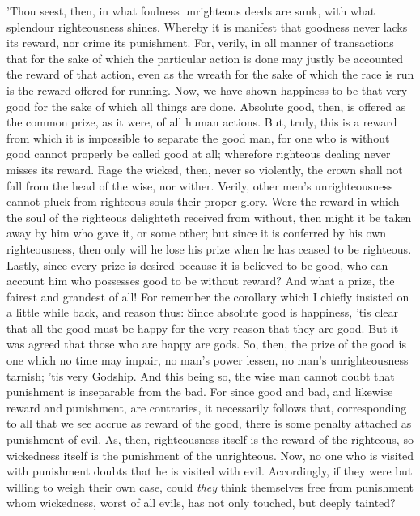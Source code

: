'Thou seest, then, in what foulness unrighteous deeds are sunk, with
what splendour righteousness shines. Whereby it is manifest that
goodness never lacks its reward, nor crime its punishment. For, verily,
in all manner of transactions that for the sake of which the particular
action is done may justly be accounted the reward of that action, even
as the wreath for the sake of which the race is run is the reward
offered for running. Now, we have shown happiness to be that very good
for the sake of which all things are done. Absolute good, then, is
offered as the common prize, as it were, of all human actions. But,
truly, this is a reward from which it is impossible to separate the good
man, for one who is without good cannot properly be called good at all;
wherefore righteous dealing never misses its reward. Rage the wicked,
then, never so violently, the crown shall not fall from the head of the
wise, nor wither. Verily, other men's unrighteousness cannot pluck from
righteous souls their proper glory. Were the reward in which the soul of
the righteous delighteth received from without, then might it be taken
away by him who gave it, or some other; but since it is conferred by his
own righteousness, then only will he lose his prize when he has ceased
to be righteous. Lastly, since every prize is desired because it is
believed to be good, who can account him who possesses good to be
without reward? And what a prize, the fairest and grandest of all! For
remember the corollary which I chiefly insisted on a little while back,
and reason thus: Since absolute good is happiness, 'tis clear that all
the good must be happy for the very reason that they are good. But it
was agreed that those who are happy are gods. So, then, the prize of the
good is one which no time may impair, no man's power lessen, no man's
unrighteousness tarnish; 'tis very Godship. And this being so, the wise
man cannot doubt that punishment is inseparable from the bad. For since
good and bad, and likewise reward and punishment, are contraries, it
necessarily follows that, corresponding to all that we see accrue as
reward of the good, there is some penalty attached as punishment of
evil. As, then, righteousness itself is the reward of the righteous, so
wickedness itself is the punishment of the unrighteous. Now, no one who
is visited with punishment doubts that he is visited with evil.
Accordingly, if they were but willing to weigh their own case, could
\emph{they} think themselves free from punishment whom wickedness, worst of
all evils, has not only touched, but deeply tainted?

